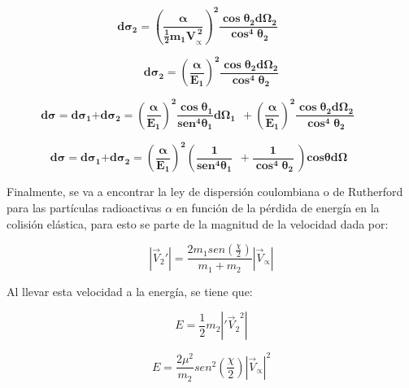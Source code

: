 \documentclass[]{article}
\begin{document}
\[\mathbf{d}\mathbf{\sigma}_{\mathbf{2}}\mathbf{=}\left( \frac{\mathbf{\alpha}}{\frac{\mathbf{1}}{\mathbf{2}}{\mathbf{m}_{\mathbf{1}}\mathbf{V}}_{\mathbf{\propto}}^{\mathbf{\ 2}}} \right)^{\mathbf{2}}\frac{\mathbf{\cos}\mathbf{\theta}_{\mathbf{2}}\mathbf{d}\mathbf{\Omega}_{\mathbf{2}}}{\mathbf{\cos}^{\mathbf{4}}\mathbf{\theta}_{\mathbf{2}}}\mathbf{\ \ \ \ \ \ \ \ \ \ \ }\]

\[\mathbf{d}\mathbf{\sigma}_{\mathbf{2}}\mathbf{=}\left( \frac{\mathbf{\alpha}}{\mathbf{E}_{\mathbf{1}}} \right)^{\mathbf{2}}\frac{\mathbf{\cos}\mathbf{\theta}_{\mathbf{2}}\mathbf{d}\mathbf{\Omega}_{\mathbf{2}}}{\mathbf{\cos}^{\mathbf{4}}\mathbf{\theta}_{\mathbf{2}}}\]

\[\mathbf{d\sigma = d}\mathbf{\sigma}_{\mathbf{1}}\mathbf{+ d}\mathbf{\sigma}_{\mathbf{2}}\mathbf{=}\left( \frac{\mathbf{\alpha}}{\mathbf{E}_{\mathbf{1}}} \right)^{\mathbf{2}}\frac{\mathbf{\cos}\mathbf{\theta}_{\mathbf{1}}}{\mathbf{sen}^{\mathbf{4}}\mathbf{\theta}_{\mathbf{1}}}\mathbf{d}\mathbf{\Omega}_{\mathbf{1}}\mathbf{\ \  +}\left( \frac{\mathbf{\alpha}}{\mathbf{E}_{\mathbf{1}}} \right)^{\mathbf{2}}\frac{\mathbf{\cos}\mathbf{\theta}_{\mathbf{2}}\mathbf{d}\mathbf{\Omega}_{\mathbf{2}}}{\mathbf{\cos}^{\mathbf{4}}\mathbf{\theta}_{\mathbf{2}}}\mathbf{\ \ \ \ \ \ \ \ \ \ \ }\]

\[\mathbf{d\sigma = d}\mathbf{\sigma}_{\mathbf{1}}\mathbf{+ d}\mathbf{\sigma}_{\mathbf{2}}\mathbf{=}\left( \frac{\mathbf{\alpha}}{\mathbf{E}_{\mathbf{1}}} \right)^{\mathbf{2}}\left( \frac{\mathbf{1}}{\mathbf{sen}^{\mathbf{4}}\mathbf{\theta}_{\mathbf{1}}}\mathbf{\ \  +}\frac{\mathbf{1}}{\mathbf{\cos}^{\mathbf{4}}\mathbf{\theta}_{\mathbf{2}}}\mathbf{\ } \right)\mathbf{cos\theta d}\mathbf{\Omega}\mathbf{\ \ \ \ \ \ \ \ \ \ }\]

Finalmente, se va a encontrar la ley de dispersión coulombiana o de
Rutherford para las partículas radioactivas \(\alpha\) en función de la
pérdida de energía en la colisión elástica, para esto se parte de la
magnitud de la velocidad dada por:

\[\left| {\overrightarrow{V}}_{2}' \right| = \frac{2m_{1}{sen}\left( \frac{\chi}{2} \right)}{m_{1} + m_{2}}\left| {\overrightarrow{V}}_{\propto} \right|\]

Al llevar esta velocidad a la energía, se tiene que:

\[E = \frac{1}{2}m_{2}\left| '{{\overrightarrow{V}}_{2}}^{2} \right|\]

\[E = \frac{2\mu^{2}}{m_{2}}{sen}^{2}\left( \frac{\chi}{2} \right)\left| {\overrightarrow{V}}_{\propto} \right|^{2}\]
\end{document}
